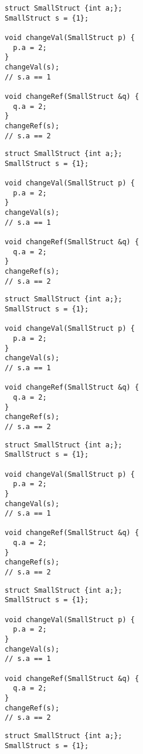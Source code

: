 \begin{frame}[fragile]
  \begin{multicols}{2}
    \begin{overprint}[\columnwidth]
      \begin{verbatim}
struct SmallStruct {int a;};
SmallStruct s = {1};

void changeVal(SmallStruct p) {
  p.a = 2;
}
changeVal(s);
// s.a == 1

void changeRef(SmallStruct &q) {
  q.a = 2;
}
changeRef(s);
// s.a == 2
      \end{verbatim}
      \begin{verbatim}
struct SmallStruct {int a;};
SmallStruct s = {1};

void changeVal(SmallStruct p) {
  p.a = 2;
}
changeVal(s);
// s.a == 1

void changeRef(SmallStruct &q) {
  q.a = 2;
}
changeRef(s);
// s.a == 2
      \end{verbatim}
      \begin{verbatim}
struct SmallStruct {int a;};
SmallStruct s = {1};

void changeVal(SmallStruct p) {
  p.a = 2;
}
changeVal(s);
// s.a == 1

void changeRef(SmallStruct &q) {
  q.a = 2;
}
changeRef(s);
// s.a == 2
      \end{verbatim}
      \begin{verbatim}
struct SmallStruct {int a;};
SmallStruct s = {1};

void changeVal(SmallStruct p) {
  p.a = 2;
}
changeVal(s);
// s.a == 1

void changeRef(SmallStruct &q) {
  q.a = 2;
}
changeRef(s);
// s.a == 2
      \end{verbatim}
      \begin{verbatim}
struct SmallStruct {int a;};
SmallStruct s = {1};

void changeVal(SmallStruct p) {
  p.a = 2;
}
changeVal(s);
// s.a == 1

void changeRef(SmallStruct &q) {
  q.a = 2;
}
changeRef(s);
// s.a == 2
      \end{verbatim}
      \begin{verbatim}
struct SmallStruct {int a;};
SmallStruct s = {1};


\end{verbatim}
\end{overprint}
\end{multicols}
\end{frame}
